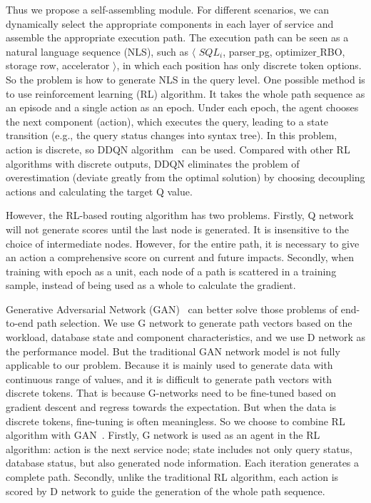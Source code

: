 Thus we propose a self-assembling module. For different scenarios, we can dynamically select the appropriate components in each layer of service and assemble the appropriate execution path. The execution path can be seen as a natural language sequence (NLS), such as $\langle$ $SQL_i$, parser$\_$pg, optimizer$\_$RBO, storage row, accelerator $\rangle$, in which each position has only discrete token options. So the problem is how to generate NLS in the query level. One possible method is to use reinforcement learning (RL)  algorithm. It takes the whole path sequence as an episode and a single action as an epoch. Under each epoch, the agent chooses the next component (action), which executes the query, leading to a state transition (e.g., the query status changes into syntax tree). In this problem, action is discrete, so DDQN algorithm~\cite{DBLP:conf/aaai/HasseltGS16} can be used. Compared with other RL algorithms with discrete outputs,  DDQN eliminates the problem of overestimation (deviate greatly from the optimal solution) by choosing decoupling actions and calculating the target Q value.


However, the RL-based routing algorithm has two problems.  Firstly, Q network will not generate scores until the last node is generated. It is insensitive to the choice of intermediate nodes. However, for the entire path, it is necessary to give an action a comprehensive score on current and future impacts. 
Secondly, when training with epoch as a unit, each node of a path is scattered in a training sample, instead of being used as a whole to calculate the gradient. 


Generative Adversarial Network (GAN)~\cite{DBLP:journals/corr/abs-1902-05687} can better solve those problems of end-to-end path selection. We use G network to generate path vectors based on the workload, database state and component characteristics, and we use D network as the performance model. 
But the traditional GAN network model is not fully applicable to our problem. Because it is mainly used to generate data with continuous range of values, and it is difficult to generate path vectors with discrete tokens. That is because G-networks need to be fine-tuned based on gradient descent and regress towards the expectation. But when the data is discrete tokens, fine-tuning is often meaningless. So we choose to combine RL algorithm with GAN~\cite{DBLP:conf/aaai/YuZWY17}. Firstly, G network is used as an agent in the RL algorithm: action is the next service node; state includes not only query status, database status, but also generated node information. Each iteration generates a complete path. Secondly, unlike the traditional RL algorithm, each action is scored by D network to guide the generation of the whole path sequence.

